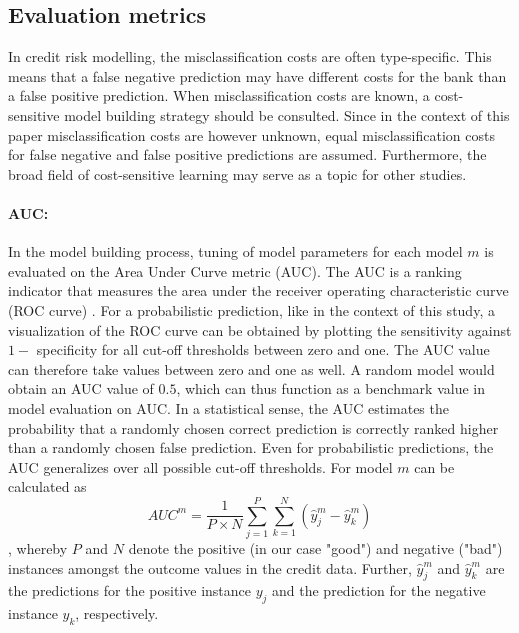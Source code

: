 \documentclass[12pt]{article}
\begin{document}
\subsection{Evaluation metrics}\label{metrics}
In credit risk modelling, the misclassification costs are often type-specific. This means that a false negative prediction may have different costs for the bank than a false positive prediction. When misclassification costs are known, a cost-sensitive model building strategy should be consulted. Since in the context of this paper misclassification costs are however unknown, equal misclassification costs for false negative and false positive predictions are assumed. Furthermore, the broad field of cost-sensitive learning may serve as a topic for other studies. 

\paragraph{AUC:} In the model building process, tuning of model parameters for each model $m$ is evaluated on the Area Under Curve metric (AUC). The AUC is a ranking indicator that measures the area under the receiver operating characteristic curve (ROC curve) \citep{hanley1982meaning}. For a probabilistic prediction, like in the context of this study, a visualization of the ROC curve can be obtained by plotting the sensitivity against $1 -$ specificity for all cut-off thresholds between zero and one. The AUC value can therefore take values between zero and one as well. A random model would obtain an AUC value of $0.5$, which can thus function as a benchmark value in model evaluation on AUC. In a statistical sense, the AUC estimates the probability that a randomly chosen correct prediction is correctly ranked higher than a randomly chosen false prediction. Even for probabilistic predictions, the AUC generalizes over all possible cut-off thresholds. For model $m$ can be calculated as
\begin{equation}
AUC^m = \frac{1}{P \times N}\sum_{j=1}^{P}\sum_{k=1}^{N}(\hat{y}^m_j - \hat{y}^m_k)
\end{equation}
, whereby $P$ and $N$ denote the positive (in our case "good") and negative ("bad") instances amongst the outcome values in the credit data. Further, $\hat{y}^m_j$ and $\hat{y}^m_k$ are the predictions for the positive instance $y_j$ and the prediction for the negative instance $y_k$, respectively.
\end{document}
